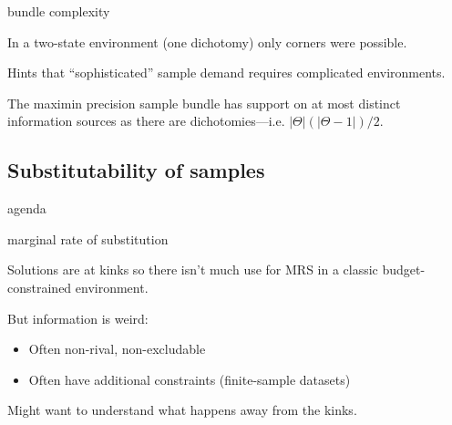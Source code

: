 \documentclass[square,]{gBakerBeamer}
\renewcommand{\|}{\,|\,}
\begin{document}
\begin{frame}{bundle complexity}

  In a two-state environment (one dichotomy) only corners were possible.\bigskip

  Hints that ``sophisticated'' sample demand requires complicated environments.\bigskip\pause

  \begin{proposition}
    The maximin precision sample bundle has support on at most distinct information sources as there are dichotomies---i.e. $|\Theta|(|\Theta-1|)/2$.
  \end{proposition}

  \note{%

  }
\end{frame}



\subsection{Substitutability of samples}
\label{sec:label}

\begin{frame}{agenda}

  \tableofcontents[currentsubsection,sectionstyle=show/shaded]

  \note{
  }
\end{frame}


\begin{frame}{marginal rate of substitution}

  Solutions are at kinks so there isn't much use for MRS in a classic budget-constrained environment.\bigskip\pause

  But information is weird:

  \begin{itemize}
    \item<2-> Often non-rival, non-excludable
    \item<3-> Often have additional constraints (finite-sample datasets)
  \end{itemize}\pause\bigskip

  Might want to understand what happens away from the kinks.

  \note{%

  }
\end{frame}
\end{document}
